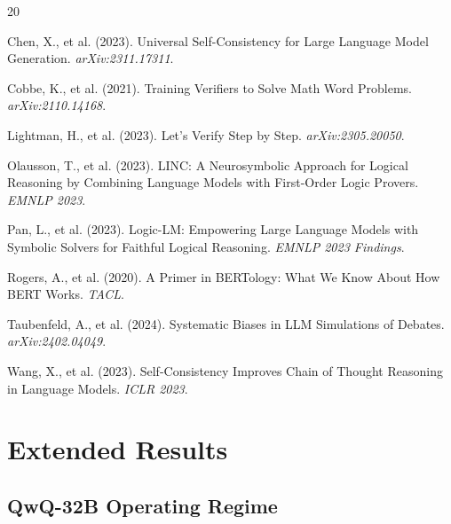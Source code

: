 \documentclass[11pt,a4paper]{article}
\begin{document}


\begin{thebibliography}{20}

Chen, X., et al. (2023). Universal Self-Consistency for Large Language Model Generation. \textit{arXiv:2311.17311}.

Cobbe, K., et al. (2021). Training Verifiers to Solve Math Word Problems. \textit{arXiv:2110.14168}.

Lightman, H., et al. (2023). Let's Verify Step by Step. \textit{arXiv:2305.20050}.

Olausson, T., et al. (2023). LINC: A Neurosymbolic Approach for Logical Reasoning by Combining Language Models with First-Order Logic Provers. \textit{EMNLP 2023}.

Pan, L., et al. (2023). Logic-LM: Empowering Large Language Models with Symbolic Solvers for Faithful Logical Reasoning. \textit{EMNLP 2023 Findings}.

Rogers, A., et al. (2020). A Primer in BERTology: What We Know About How BERT Works. \textit{TACL}.

Taubenfeld, A., et al. (2024). Systematic Biases in LLM Simulations of Debates. \textit{arXiv:2402.04049}.

Wang, X., et al. (2023). Self-Consistency Improves Chain of Thought Reasoning in Language Models. \textit{ICLR 2023}.

\end{thebibliography}

\appendix
\section{Extended Results}

\subsection{QwQ-32B Operating Regime}
\end{document}
